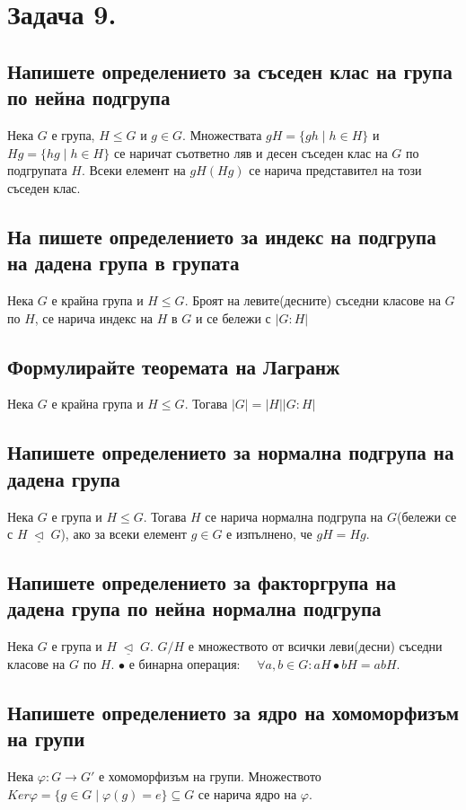 \documentclass[12pt]{article}
\newcommand{\triq}{\; \underline{\triangleleft} \;}
\begin{document}
\section*{Задача 9.}

\subsection*{Напишете определението за съседен клас на група по нейна подгрупа}
Нека $G$ е група, $H \leq G$ и $g \in G$. Множествата $gH = \{gh \mid h \in H\}$ и $Hg = \{hg \mid h \in H\}$ се наричат съответно ляв и десен съседен клас на $G$ по подгрупата $H$. Всеки елемент на $gH(Hg)$ се нарича представител на този съседен клас.

\subsection*{На пишете определението за индекс на подгрупа на дадена група в групата}
Нека $G$ е крайна група и $H \leq G$. Броят на левите(десните) съседни класове на $G$ по $H$, се нарича индекс на $H$ в $G$ и се бележи с $|G:H|$

\subsection*{Формулирайте теоремата на Лагранж}
Нека $G$ е крайна група и $H \leq G$. Тогава $|G| = |H||G:H|$

\subsection*{Напишете определението за нормална подгрупа на дадена група}
Нека $G$ е група и $H \leq G$. Тогава $H$ се нарича нормална подгрупа на $G$(бележи се с $H \triq G$), ако за всеки елемент $g \in G$ е изпълнено, че $gH = Hg$.

\subsection*{Напишете определението за факторгрупа на дадена група по нейна нормална подгрупа}
Нека $G$ е група и $H \triq G$. $G/H$ е множеството от всички леви(десни) съседни класове на $G$ по $H$. $\bullet$ е бинарна операция: $\quad \forall a,b \in G: aH \bullet bH = abH$.

\subsection*{Напишете определението за ядро на хомоморфизъм на групи}
Нека $\varphi: G \to G'$ е хомоморфизъм на групи. Множеството $Ker\varphi = \{g \in G \mid \varphi(g) = e\} \subseteq G$ се нарича ядро на $\varphi$.
\end{document}
